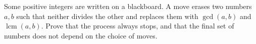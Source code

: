 Some positive integers are written on a blackboard. A move erases two numbers $a,b$ such that neither divides the other and replaces them with $\gcd(a,b)$ and $\operatorname{lcm}(a,b)$. Prove that the process always stops, and that the final set of numbers does not depend on the choice of moves.
